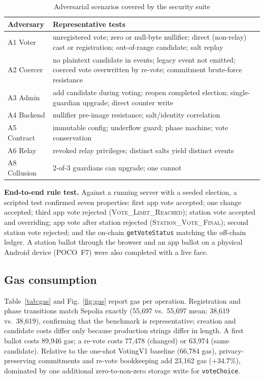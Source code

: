 \documentclass[conference]{IEEEtran}
\newcommand{\code}[1]{\texttt{\small #1}}
\begin{document}
\begin{table}[t]
\caption{Adversarial scenarios covered by the security suite}
\label{tab:attacks}
\centering
\footnotesize
\begin{tabular}{@{}p{1.95cm}p{6.05cm}@{}}
\toprule
\textbf{Adversary} & \textbf{Representative tests} \\
\midrule
A1 Voter & unregistered vote; zero or null-byte nullifier; direct (non-relay) cast or registration; out-of-range candidate; salt replay \\
A2 Coercer & no plaintext candidate in events; legacy event not emitted; coerced vote overwritten by re-vote; commitment brute-force resistance \\
A3 Admin & add candidate during voting; reopen completed election; single-guardian upgrade; direct counter write \\
A4 Backend & nullifier pre-image resistance; salt/identity correlation \\
A5 Contract & immutable config; underflow guard; phase machine; vote conservation \\
A6 Relay & revoked relay privileges; distinct salts yield distinct events \\
A8 Collusion & 2-of-3 guardians can upgrade; one cannot \\
\bottomrule
\end{tabular}
\end{table}

\textbf{End-to-end rule test.} Against a running server with a seeded election, a scripted test confirmed seven properties: first app vote accepted; one change accepted; third app vote rejected (\textsc{Vote\_Limit\_Reached}); station vote accepted and overriding; app vote after station rejected (\textsc{Station\_Vote\_Final}); second station vote rejected; and the on-chain \code{getVoteStatus} matching the off-chain ledger. A station ballot through the browser and an app ballot on a physical Android device (POCO~F7) were also completed with a live face.

\subsection{Gas consumption}
Table~\ref{tab:gas} and Fig.~\ref{fig:gas} report gas per operation. Registration and phase transitions match Sepolia exactly (55,697 vs.\ 55,697 mean; 38,619 vs.\ 38,619), confirming that the benchmark is representative; creation and candidate costs differ only because production strings differ in length. A first ballot costs 89,946 gas; a re-vote costs 77,478 (changed) or 63,974 (same candidate). Relative to the one-shot VotingV1 baseline (66,784 gas), privacy-preserving commitments and re-vote bookkeeping add 23,162 gas (+34.7\%), dominated by one additional zero-to-non-zero storage write for \code{voteChoice}.
\end{document}
